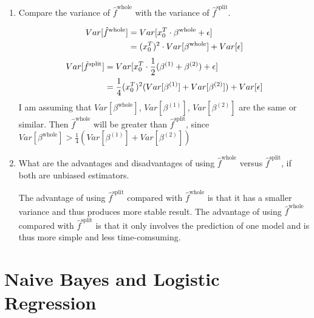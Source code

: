 \documentclass[11pt]{article}
\begin{document}
\begin{enumerate}
\item Compare the variance of $\hat{f}^{\text{whole}}$ with the variance of $\hat{f}^{\text{split}}$.\\

\begin{answertext}{8cm}{}

\begin{align}
Var[\hat{f}^{\text{whole}}] &= Var[x_{0}^{T}\cdot\beta^{\text{whole}} + \epsilon] \notag\\
&= (x_{0}^{T})^{2} \cdot Var[\beta^{\text{whole}}] + Var[\epsilon] \notag
\end{align}
\begin{align}
Var[\hat{f}^{\text{split}}] &= Var[x_{0}^{T}\cdot\frac{1}{2}(\beta^{(1)} + \beta^{(2)}) + \epsilon] \notag\\
&= \frac{1}{4}(x_{0}^{T})^{2} (Var[\beta^{(1)}] + Var[\beta^{(2)}]) + Var[\epsilon] \notag
\end{align}
I am assuming that $Var[\beta^{\text{whole}}]$, $Var[\beta^{(1)}]$, $Var[\beta^{(2)}]$ are the same or similar.
Then $\hat{f}^{\text{whole}}$ will be greater than $\hat{f}^{\text{split}}$, since 
$Var[\beta^{\text{whole}}] > \frac{1}{4}(Var[\beta^{(1)}] + Var[\beta^{(2)}])$ \\

\end{answertext} 

\pagebreak 

\item What are the advantages and disadvantages of using $\hat{f}^{\text{whole}}$ versus $\hat{f}^{\text{split}}$, if both are unbiased estimators.\\

\begin{answertext}{5cm}{}

The advantage of using $\hat{f}^{\text{split}}$ compared with $\hat{f}^{\text{whole}}$ is that it has a smaller variance and thus produces more stable result.
The advantage of using $\hat{f}^{\text{whole}}$ compared with $\hat{f}^{\text{split}}$ is that it only involves the prediction of one model and is thus more simple and less time-comsuming.

\end{answertext} 
\end{enumerate}

\pagebreak
\section{Naive Bayes and Logistic Regression}
\end{document}
